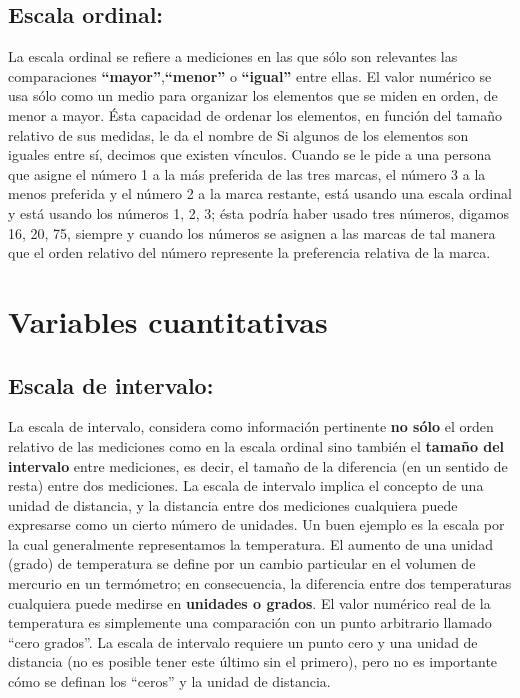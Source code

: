 \documentclass[
  a4paper,
  oneside,
  openany]{book}
\begin{document}
\hypertarget{escala-ordinal}{%
\subsection{Escala ordinal:}\label{escala-ordinal}}

La escala ordinal se refiere a mediciones en las que sólo son relevantes las comparaciones \textbf{``mayor''},\textbf{``menor''} o \textbf{``igual''} entre ellas. El valor numérico se usa sólo como un medio para organizar los elementos que se miden en orden, de menor a mayor.
Ésta capacidad de ordenar los elementos, en función del tamaño relativo de sus medidas, le da el nombre de
Si algunos de los elementos son iguales entre sí, decimos que existen vínculos. Cuando se le pide a una persona que asigne el número 1 a la más preferida de las tres marcas, el número 3 a la menos preferida y el número 2 a la marca restante, está usando una escala ordinal y está usando los números 1, 2, 3; ésta podría haber usado tres números, digamos 16, 20, 75, siempre y cuando los números se asignen a las marcas de tal manera que el orden relativo del número represente la preferencia relativa de la marca.

\hypertarget{variables-cuantitativas}{%
\section{Variables cuantitativas}\label{variables-cuantitativas}}

\hypertarget{escala-de-intervalo}{%
\subsection{Escala de intervalo:}\label{escala-de-intervalo}}

La escala de intervalo, considera como información pertinente \textbf{no sólo} el orden relativo de las mediciones como en la escala ordinal sino también el \textbf{tamaño del intervalo} entre mediciones, es decir, el tamaño de la diferencia (en un sentido de resta) entre dos mediciones. La escala de intervalo implica el concepto de una unidad de distancia, y la distancia entre dos mediciones cualquiera puede expresarse como un cierto número de unidades. Un buen ejemplo es la escala por la cual generalmente representamos la temperatura. El aumento de una unidad (grado) de temperatura se define por un cambio particular en el volumen de mercurio en un termómetro; en consecuencia, la diferencia entre dos temperaturas cualquiera puede medirse en \textbf{unidades o grados}. El valor numérico real de la temperatura es simplemente una comparación con un punto arbitrario llamado ``cero grados''. La escala de intervalo requiere un punto cero y una unidad de distancia (no es posible tener este último sin el primero), pero no es importante cómo se definan los ``ceros'' y la unidad de distancia.
\end{document}
